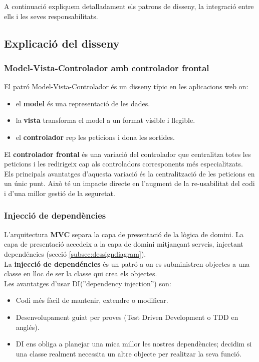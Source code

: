 A continuació expliquem detalladament els patrons de disseny, la integració entre ells i les seves responsabilitats.

\subsection{Explicaci\'{o} del disseny}
\label{subsec:dessignexplanation}

\label{mvcFrontController}
\subsubsection{Model-Vista-Controlador amb controlador frontal}
El patró Model-Vista-Controlador \'{e}s un disseny t\'{i}pic en les aplicacions web on:
\begin{itemize}
\item el \textbf{model} \'{e}s una representaci\'{o} de les dades.
\item la \textbf{vista} transforma el model a un format visible i llegible.
\item el \textbf{controlador} rep les peticions i dona les sortides.
\end{itemize}
El \textbf{controlador frontal} \'{e}s una variació del controlador que centralitza totes les peticions i les redirigeix cap als controladors corresponents m\'{e}s especialitzats.\\

Els principals avantatges d'aquesta variació \'{e}s la centralització de les peticions en un únic punt. Això t\'{e} un impacte directe en l'augment de la re-usabilitat del codi i d'una millor gestió de la seguretat.

\subsubsection{Injecció de dependències}
L'arquitectura \textbf{MVC} separa la capa de presentaci\'{o} de la l\`{o}gica de domini. La capa de presentaci\'{o} accedeix a la capa de domini mitjançant serveis, injectant depend\'{e}ncies (secció \ref{subsec:dessigndiagram}).\\

La \textbf{injecci\'{o} de depend\'{e}ncies} \'{e}s un patr\'{o} a on es subministren objectes a una classe en lloc de ser la classe qui crea els objectes.\cite{dependency_injection}\\

Les avantatges d'usar DI(''dependency injection'') son:
\begin{itemize}
\item Codi m\'{e}s f\`{a}cil de mantenir, extendre o modificar.
\item Desenvolupament guiat per proves (Test Driven Development o TDD en angl\'{e}s).
\item DI ens obliga a planejar una mica millor les nostres depend\`{e}ncies; decidim si una classe realment necessita un altre objecte per realitzar la seva funció.
\end{itemize}

